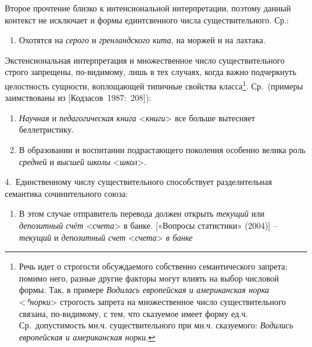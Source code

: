 Второе прочтение близко к интенсиональной интерпретации, поэтому данный
контекст не исключает и формы единтсвенного числа существительного. Ср.:

\begin{enumerate}
\def\labelenumi{(\arabic{enumi})}
\setcounter{enumi}{150}
\item
  Охотятся на \emph{серого} и \emph{гренландского} \emph{кита}, на
  моржей и на лахтака.
\end{enumerate}

Экстенсиональная интерпретация и множественное число существительного
строго запрещены, по-видимому, лишь в тех случаях, когда важно
подчеркнуть целостность сущности, воплощающей типичные свойства
класса\footnote{Речь идет о строгости обсуждаемого собственно
  семантического запрета; помимо него, разные другие факторы могут
  влиять на выбор числовой формы. Так, в примере \emph{Водилась
  европейская и американская норка}
  \textless{}\emph{*норки}\textgreater{} строгость запрета на
  множественное число существительного связана, по-видимому, с тем, что
  сказуемое имеет форму ед.ч. Ср.~допустимость мн.ч. существительного
  при мн.ч. сказуемого: \emph{Водились европейская и американская
  норки}.}. Ср.~(примеры заимствованы из {[}Кодзасов~1987:~208{]}):

\begin{enumerate}
\def\labelenumi{(\arabic{enumi})}
\setcounter{enumi}{151}
\item
  \emph{Научная} и \emph{педагогическая} \emph{книга}
  \textless*\emph{книги}\textgreater{} все больше вытесняет
  беллетристику.
\item
  В образовании и воспитании подрастающего поколения особенно велика
  роль \emph{средней} и \emph{высшей} \emph{школы}
  \textless*\emph{школ}\textgreater.
\end{enumerate}

4.~Единственному числу существительного способствует разделительная
семантика сочинительного союза:

\begin{enumerate}
\def\labelenumi{(\arabic{enumi})}
\setcounter{enumi}{153}
\item
  В этом случае отправитель перевода должен открыть \emph{текущий} или
  \emph{депозитный} \emph{счёт} \textless*\emph{счета}\textgreater{} в
  банке. {[}«Вопросы статистики» (2004){]} -- \emph{текущий} и
  \emph{депозитный счет} \textless{}\emph{счета}\textgreater{} \emph{в
  банке}
\end{enumerate}

